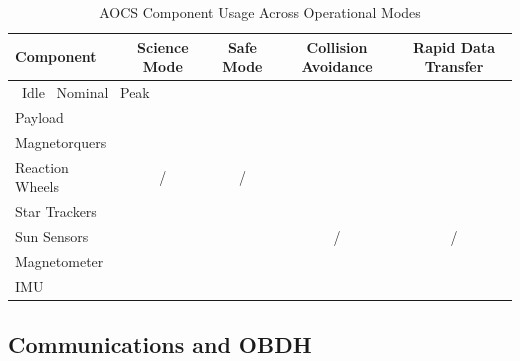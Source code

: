 \documentclass[a4paper, 11pt, conference]{IEEEtran}
\begin{document}
\begin{table}[H]
\centering
\caption{AOCS Component Usage Across Operational Modes}

\newcommand{\idle}{\ding{109}}   %
\newcommand{\nom}{\ding{108}}    %
\newcommand{\peak}{\ding{115}}   %

\begin{tabular}{l c c c c}
\hline
\textbf{Component} &
\textbf{Science Mode} &
\textbf{Safe Mode} &
\textbf{Collision Avoidance} &
\textbf{Rapid Data Transfer} \\
\hline
\multicolumn{5}{l}{\idle\ Idle \quad \nom\ Nominal \quad \peak\ Peak} \\
\hline

Payload 
& \nom\ \peak 
& \idle 
& \idle 
& \idle \\

Magnetorquers 
& \nom\ \peak 
& \nom\ \peak 
& \nom\ \peak 
& \nom\ \peak \\

Reaction Wheels 
& \idle/\nom 
& \idle/\nom 
& \nom\ \peak 
& \nom\ \peak \\

Star Trackers 
& \nom\ \peak 
& \idle\ \peak 
& \idle 
& \idle \\

Sun Sensors 
& \nom\ \peak 
& \nom\ \peak 
& \idle/\nom 
& \idle/\nom \\

Magnetometer 
& \nom\ \peak 
& \nom\ \peak 
& \nom\ \peak 
& \nom\ \peak \\

IMU 
& \nom\ \peak 
& \nom\ \peak 
& \nom\ \peak 
& \nom\ \peak \\

\hline
\end{tabular}\label{tab:aocs_modes}
\end{table}

\subsection{Communications and OBDH}
\end{document}
